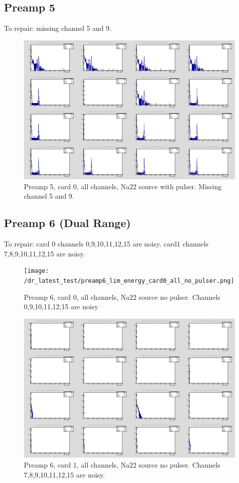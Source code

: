 \documentclass{report}
\begin{document}
\subsection{Preamp 5}
To repair: missing channel 5 and 9.
\begin{figure}[!htb]
  \includegraphics[width=\linewidth]{preamp5_lim_energy_card0_all.png}
  \caption{Preamp 5, card 0, all channels, Na22 source  with pulser. Missing channel 5 and 9.}
\end{figure}
\newpage
\clearpage




\subsection{Preamp 6 (Dual Range)}
To repair: card 0 channels 0,9,10,11,12,15 are noisy. card1 channels 7,8,9,10,11,12,15 are noisy.
\begin{figure}[!htb]
  \texttt{[image: /dr\_latest\_test/preamp6\_lim\_energy\_card0\_all\_no\_pulser.png]}
  \caption{Preamp 6, card 0, all channels, Na22 source  no pulser. Channels 0,9,10,11,12,15 are noisy }
\end{figure}

\begin{figure}[!htb]
  \includegraphics[width=\linewidth]{dr_latest_test/preamp6_lim_energy_card1_all_no_pulser.png}
  \caption{Preamp 6, card 1, all channels, Na22 source  no pulser. Channels 7,8,9,10,11,12,15 are noisy.}
\end{figure}
\newpage
\clearpage
\end{document}
